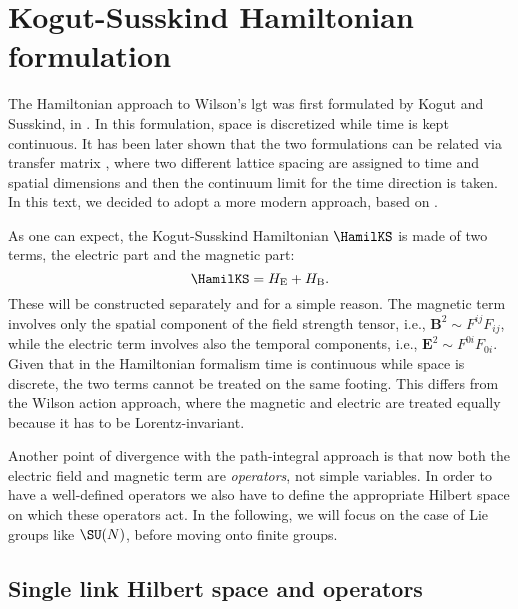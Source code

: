 \section{Kogut-Susskind Hamiltonian formulation}
\label{sec:kogut_susskind_hamiltonian_formulation}

The Hamiltonian approach to Wilson's \ac{lgt} was first formulated by Kogut and Susskind, in \cite{kogut1975hamiltonian}.
In this formulation, space is discretized while time is kept continuous.
It has been later shown that the two formulations can be related via transfer matrix \cite{creutz1977transfermatrix}, where two different lattice spacing are assigned to time and spatial dimensions and then the continuum limit for the time direction is taken.
In this text, we decided to adopt a more modern approach, based on \cite{milstead2018qyangmills,zohar2015latticegauge}.

As one can expect, the Kogut-Susskind Hamiltonian $\HamilKS$ is made of two terms, the electric part and the magnetic part:
\begin{equation}
    \HamilKS = H_{\text{E}} + H_{\text{B}}.
\end{equation}
These will be constructed separately and for a simple reason.
The magnetic term involves only the spatial component of the field strength tensor, i.e., $\mathbf{B}^{2} \sim F^{ij}F_{ij}$, while the electric term involves also the temporal components, i.e., $\mathbf{E}^2 \sim F^{0i} F_{0i}$.
Given that in the Hamiltonian formalism time is continuous while space is discrete, the two terms cannot be treated on the same footing.
This differs from the Wilson action approach, where the magnetic and electric are treated equally because it has to be Lorentz-invariant.

Another point of divergence with the path-integral approach is that now both the electric field and magnetic term are \emph{operators}, not simple variables.
In order to have a well-defined operators we also have to define the appropriate Hilbert space on which these operators act.
In the following, we will focus on the case of Lie groups like $\SU(N)$, before moving onto finite groups.


%
%
\subsection{Single link Hilbert space and operators}
\label{sub:single_link_hilbert_space_and_operators}

